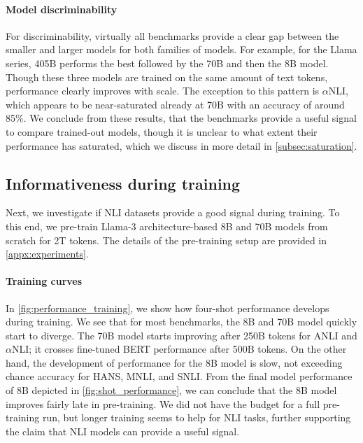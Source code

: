 \paragraph{Model discriminability}
For discriminability, virtually all benchmarks provide a clear gap between the smaller and larger models for both families of models.
For example, for the Llama series, 405B performs the best followed by the 70B and then the 8B model.
Though these three models are trained on the same amount of text tokens, performance clearly improves with scale.
The exception to this pattern is $\alpha$NLI, which appears to be near-saturated already at 70B with an accuracy of around 85\%.
We conclude from these results, that the benchmarks provide a useful signal to compare trained-out models, though it is unclear to what extent their performance has saturated, which we discuss in more detail in \cref{subsec:saturation}.

\subsection{Informativeness during training}\label{subsec:during_training}

Next, we investigate if NLI datasets provide a good signal during training.
To this end, we pre-train Llama-3 architecture-based 8B and 70B models from scratch for 2T tokens. The details of the pre-training setup are provided in \cref{appx:experiments}.

\paragraph{Training curves}
In \cref{fig:performance_training}, we show how four-shot performance develops during training.
We see that for most benchmarks, the 8B and 70B model quickly start to diverge.
The 70B model starts improving after 250B tokens for ANLI and $\alpha$NLI; it crosses fine-tuned BERT performance after 500B tokens.
On the other hand, the development of performance for the 8B model is slow, not exceeding chance accuracy for HANS, MNLI, and SNLI.
From the final model performance of 8B depicted in \cref{fig:shot_performance}, we can conclude that the 8B model improves fairly late in pre-training.
We did not have the budget for a full pre-training run, but longer training seems to help for NLI tasks, further supporting the claim that NLI models can provide a useful signal.


